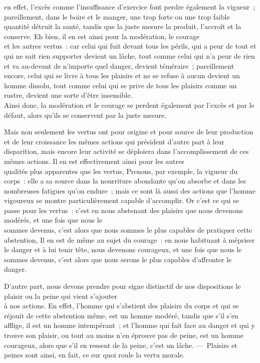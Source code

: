 \documentclass[french,twoside]{book} %
\begin{document}
en effet, l’excès comme l’insuffisance d’exercice font perdre également la vigueur ; pareillement, dans le boire et le manger, une trop forte ou une trop faible quantité détruit la santé, tandis que la juste mesure la produit, l’accroît et la conserve. Eh bien, il en est ainsi pour la modération, le courage \\
et les autres vertus : car celui qui fuit devant tous les périls, qui a peur de tout et qui ne sait rien supporter devient un lâche, tout comme celui qui n’a peur de rien et va au-devant de n’importe quel danger, devient téméraire ; pareillement encore, celui qui se livre à tous les plaisirs et ne se refuse à aucun devient un homme dissolu, tout comme celui qui se prive de tous les plaisirs comme un rustre, devient une sorte d’être insensible. \\
Ainsi donc, la modération et le courage se perdent également par l’excès et par le défaut, alors qu’ils se conservent par la juste mesure.\par
Mais non seulement les vertus ont pour origine et pour source de leur production et de leur croissance les mêmes actions qui président d’autre part à leur disparition, mais encore leur activité se déploiera dans l’accomplissement de ces mêmes actions. Il en est effectivement ainsi pour les autres \\
qualités plus apparentes que les vertus, Prenons, par exemple, la vigueur du corps : elle a sa source dans la nourriture abondante qu’on absorbe et dans les nombreuses fatigues qu’on endure ; mais ce sont là aussi des actions que l’homme vigoureux se montre particulièrement capable d’accomplir. Or c’est ce qui se passe pour les vertus : c’est en nous abstenant des plaisirs que nous devenons modérés, et une fois que nous le \\
sommes devenus, c’est alors que nous sommes le plus capables  de pratiquer cette abstention, Il en est de même au sujet du courage : en nous habituant à mépriser le danger et à lui tenir tête, nous devenons courageux, et une fois que nous le sommes devenus, c’est alors que nous serons le plus capables d’affronter le danger.\par
D’autre part, nous devons prendre pour signe distinctif de nos dispositions le plaisir ou la peine qui vient s’ajouter \\
à nos actions. En effet, l’homme qui s’abstient des plaisirs du corps et qui se réjouit de cette abstention même, est un homme modéré, tandis que s’il s’en afflige, il est un homme intempérant ; et l’homme qui fait face au danger et qui y trouve son plaisir, ou tout au moins n’en éprouve pas de peine, est un homme courageux, alors que s’il en ressent de la peine, c’est un lâche. — Plaisirs et peines sont ainsi, en fait, ce sur quoi roule la vertu morale.\par
\end{document}

